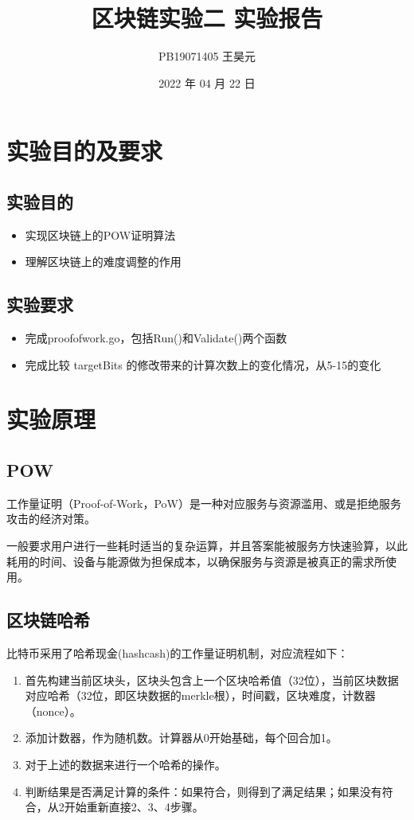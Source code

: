 \documentclass{article}
\title{区块链实验二 实验报告}
\author{PB19071405 王昊元}
\date{2022 年 04 月 22 日}
\begin{document}
    \maketitle

    \section{实验目的及要求}
    \subsection{实验目的}
    \begin{itemize}
        \item 实现区块链上的POW证明算法
        \item 理解区块链上的难度调整的作用
    \end{itemize}
    \subsection{实验要求}
    \begin{itemize}
        \item 完成{\jetbrains proofofwork.go}，包括{\jetbrains Run()}和{\jetbrains Validate()}两个函数
        \item 完成比较 {\jetbrains targetBits} 的修改带来的计算次数上的变化情况，从5-15的变化
    \end{itemize}
    \section{实验原理}
    \subsection{POW}
    工作量证明（Proof-of-Work，PoW）是一种对应服务与资源滥用、或是拒绝服务攻击的经济对策。

    一般要求用户进行一些耗时适当的复杂运算，并且答案能被服务方快速验算，以此耗用的时间、设备与能源做为担保成本，以确保服务与资源是被真正的需求所使用。
    \subsection{区块链哈希} \label{blockchain hash}
    比特币采用了哈希现金(hashcash)的工作量证明机制，对应流程如下：
    \begin{enumerate}[label=\arabic*.]
        \item 首先构建当前区块头，区块头包含上⼀个区块哈希值（32位），当前区块数据对应哈希（32位，即区块数据的merkle根），时间戳，区块难度，计数器（nonce）。
        \item 添加计数器，作为随机数。计算器从0开始基础，每个回合加1。
        \item 对于上述的数据来进行一个哈希的操作。
        \item 判断结果是否满足计算的条件：如果符合，则得到了满足结果；如果没有符合，从2开始重新直接2、3、4步骤。
    \end{enumerate}
\end{document}
